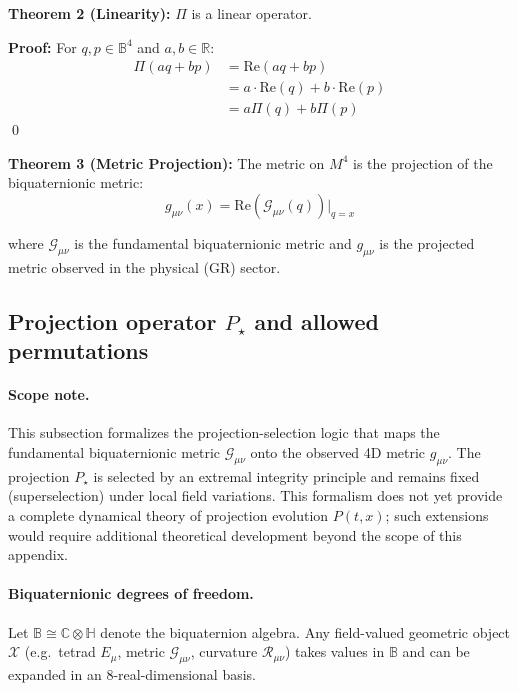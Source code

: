 \textbf{Theorem 2 (Linearity):} $\Pi$ is a linear operator.

\textbf{Proof:} For $q, p \in \mathbb{B}^4$ and $a, b \in \mathbb{R}$:
\begin{align}
\Pi(aq + bp) &= \text{Re}(aq + bp) \\
&= a \cdot \text{Re}(q) + b \cdot \text{Re}(p) \\
&= a \Pi(q) + b \Pi(p)
\end{align}
\qed

\textbf{Theorem 3 (Metric Projection):} The metric on $M^4$ is the projection of the biquaternionic metric:
\begin{equation}
g_{\mu\nu}(x) = \text{Re}(\mathcal{G}_{\mu\nu}(q))\Big|_{q=x}
\end{equation}

where $\mathcal{G}_{\mu\nu}$ is the fundamental biquaternionic metric and $g_{\mu\nu}$ is the projected metric observed in the physical (GR) sector.


\subsection{Projection operator $P_\star$ and allowed permutations}

\paragraph{Scope note.}
This subsection formalizes the projection-selection logic that maps the fundamental biquaternionic metric $\mathcal{G}_{\mu\nu}$ onto the observed 4D metric $g_{\mu\nu}$.
The projection $P_\star$ is selected by an extremal integrity principle and remains fixed (superselection) under local field variations.
This formalism does not yet provide a complete dynamical theory of projection evolution $P(t,x)$; such extensions would require additional theoretical development beyond the scope of this appendix.

\paragraph{Biquaternionic degrees of freedom.}
Let $\mathbb{B} \cong \mathbb{C}\otimes\mathbb{H}$ denote the biquaternion algebra.
Any field-valued geometric object $\mathcal{X}$ (e.g.\ tetrad $E_\mu$, metric $\mathcal{G}_{\mu\nu}$, curvature $\mathcal{R}_{\mu\nu}$)
takes values in $\mathbb{B}$ and can be expanded in an 8-real-dimensional basis.

